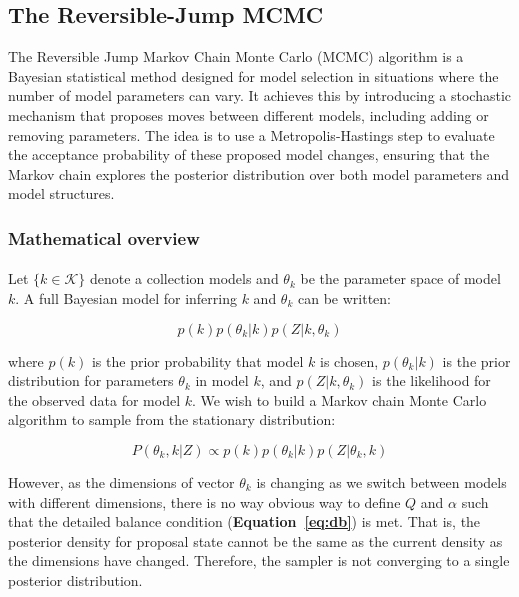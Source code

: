 \documentclass{article}
\begin{document}
\subsection{The Reversible-Jump MCMC}
The Reversible Jump Markov Chain Monte Carlo (MCMC) algorithm is a Bayesian statistical method designed for model selection in situations where the number of model parameters can vary. It achieves this by introducing a stochastic mechanism that proposes moves between different models, including adding or removing parameters. The idea is to use a Metropolis-Hastings step to evaluate the acceptance probability of these proposed model changes, ensuring that the Markov chain explores the posterior distribution over both model parameters and model structures.  

\subsubsection{Mathematical overview}

\paragraph{}Let $\{k \in \mathcal{K}\}$ denote a collection models and  $\theta_k$ be the parameter space of model $k$. A full Bayesian model for inferring $k$ and $\theta_k$ can be written:

$$p(k)p(\theta_k|k)p(Z| k, \theta_k) $$

where $p(k)$ is the prior probability that model $k$ is chosen, $p(\theta_k|k)$ is the prior distribution for parameters $\theta_k$ in model $k$, and $p(Z| k, \theta_k) $ is the likelihood for the observed data for model $k$. We wish to build a Markov chain Monte Carlo algorithm to sample from the stationary distribution: 

\begin{equation}
P(\theta_k, k | Z) \propto p(k)p(\theta_k|k)p(Z | \theta_k, k)
\end{equation}

However, as the dimensions of vector $\theta_k$ is changing as we switch between models with different dimensions, there is no way obvious way to define $Q$ and $\alpha$ such that the detailed balance condition (\textbf{Equation~\ref{eq:db}}) is met. That is, the posterior density for proposal state cannot be the same as the current density as the dimensions have changed. Therefore, the sampler is not converging to a single posterior distribution. 
\end{document}
